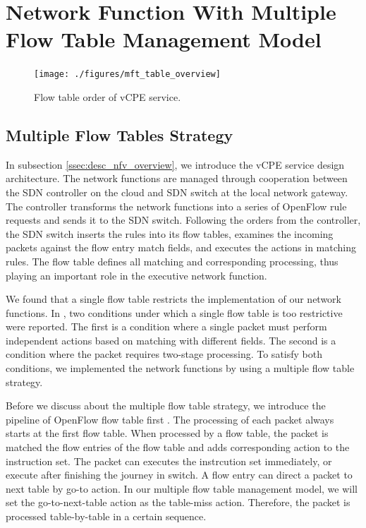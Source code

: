 \documentclass[journal]{IEEEtran}
\begin{document}
\section{Network Function With Multiple Flow Table Management Model} \label{sec:mft}

\begin{figure}[!t]
\centering
\texttt{[image: ./figures/mft\_table\_overview]}
\caption{Flow table order of vCPE service.}
\label{fig:mft_table_overview}
\end{figure}

\subsection{Multiple Flow Tables Strategy}
In subsection \ref{ssec:desc_nfv_overview}, we introduce the vCPE service design architecture. The network functions are managed through cooperation between the SDN controller on the cloud and SDN switch at the local network gateway. The controller transforms the network functions into a series of OpenFlow rule requests and sends it to the SDN switch. Following the orders from the controller, the SDN switch inserts the rules into its flow tables, examines the incoming packets against the flow entry match fields, and executes the actions in matching rules. The flow table \cite{sdn-ft} defines all matching and corresponding processing, thus playing an important role in the executive network function.

We found that a single flow table restricts the implementation of our network functions. In \cite{onf-multi-tables}, two conditions under which a single flow table is too restrictive were reported. The first is a condition where a single packet must perform independent actions based on matching with different fields. The second is a condition where the packet requires two-stage processing. To satisfy both conditions, we implemented the network functions by using a multiple flow table strategy.

Before we discuss about the multiple flow table strategy, we introduce the pipeline of OpenFlow flow table first \cite{sp:openflow13}. The processing of each packet always starts at the first flow table. When processed by a flow table, the packet is matched the flow entries of the flow table and adds corresponding action to the instruction set. The packet can executes the instrcution set immediately, or execute after finishing the journey in switch. A flow entry can direct a packet to next table by go-to action. In our multiple flow table management model, we will set the go-to-next-table action as the table-miss action. Therefore, the packet is processed table-by-table in a certain sequence.
\end{document}
